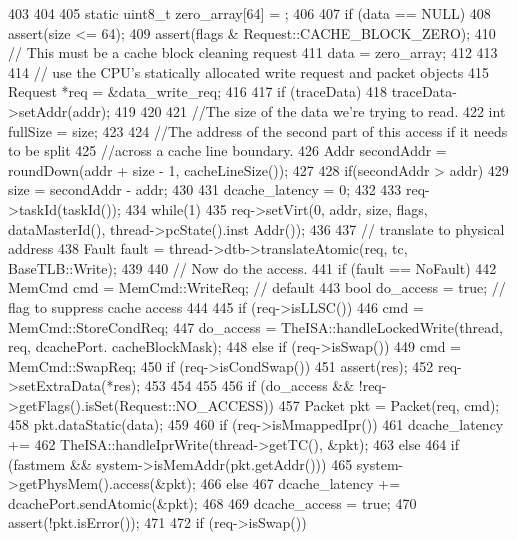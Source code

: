 \begin{DoxyCode}
403 {
404 
405     static uint8_t zero_array[64] = {};
406 
407     if (data == NULL) {
408         assert(size <= 64);
409         assert(flags & Request::CACHE_BLOCK_ZERO);
410         // This must be a cache block cleaning request
411         data = zero_array;
412     }
413 
414     // use the CPU's statically allocated write request and packet objects
415     Request *req = &data_write_req;
416 
417     if (traceData) {
418         traceData->setAddr(addr);
419     }
420 
421     //The size of the data we're trying to read.
422     int fullSize = size;
423 
424     //The address of the second part of this access if it needs to be split
425     //across a cache line boundary.
426     Addr secondAddr = roundDown(addr + size - 1, cacheLineSize());
427 
428     if(secondAddr > addr)
429         size = secondAddr - addr;
430 
431     dcache_latency = 0;
432 
433     req->taskId(taskId());
434     while(1) {
435         req->setVirt(0, addr, size, flags, dataMasterId(), thread->pcState().inst
      Addr());
436 
437         // translate to physical address
438         Fault fault = thread->dtb->translateAtomic(req, tc, BaseTLB::Write);
439 
440         // Now do the access.
441         if (fault == NoFault) {
442             MemCmd cmd = MemCmd::WriteReq; // default
443             bool do_access = true;  // flag to suppress cache access
444 
445             if (req->isLLSC()) {
446                 cmd = MemCmd::StoreCondReq;
447                 do_access = TheISA::handleLockedWrite(thread, req, dcachePort.
      cacheBlockMask);
448             } else if (req->isSwap()) {
449                 cmd = MemCmd::SwapReq;
450                 if (req->isCondSwap()) {
451                     assert(res);
452                     req->setExtraData(*res);
453                 }
454             }
455 
456             if (do_access && !req->getFlags().isSet(Request::NO_ACCESS)) {
457                 Packet pkt = Packet(req, cmd);
458                 pkt.dataStatic(data);
459 
460                 if (req->isMmappedIpr()) {
461                     dcache_latency +=
462                         TheISA::handleIprWrite(thread->getTC(), &pkt);
463                 } else {
464                     if (fastmem && system->isMemAddr(pkt.getAddr()))
465                         system->getPhysMem().access(&pkt);
466                     else
467                         dcache_latency += dcachePort.sendAtomic(&pkt);
468                 }
469                 dcache_access = true;
470                 assert(!pkt.isError());
471 
472                 if (req->isSwap()) {
}}}}}
\end{DoxyCode}
